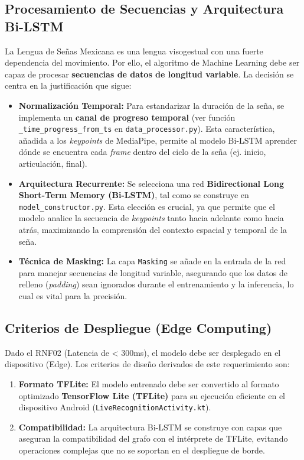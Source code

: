\subsection{Procesamiento de Secuencias y Arquitectura Bi-LSTM}
La Lengua de Señas Mexicana es una lengua visogestual con una fuerte dependencia del movimiento. Por ello, el algoritmo de Machine Learning debe ser capaz de procesar \textbf{secuencias de datos de longitud variable}. La decisión se centra en la justificación que sigue:

\begin{itemize}
    \item \textbf{Normalización Temporal:} Para estandarizar la duración de la seña, se implementa un \textbf{canal de progreso temporal} (ver función \texttt{\_time\_progress\_from\_ts} en \texttt{data\_processor.py}). Esta característica, añadida a los \textit{keypoints} de MediaPipe, permite al modelo Bi-LSTM aprender dónde se encuentra cada \textit{frame} dentro del ciclo de la seña (ej. inicio, articulación, final).
    \item \textbf{Arquitectura Recurrente:} Se selecciona una red \textbf{Bidirectional Long Short-Term Memory (Bi-LSTM)}, tal como se construye en \texttt{model\_constructor.py}. Esta elección es crucial, ya que permite que el modelo analice la secuencia de \textit{keypoints} tanto hacia adelante como hacia atrás, maximizando la comprensión del contexto espacial y temporal de la seña.
    \item \textbf{Técnica de Masking:} La capa \texttt{Masking} se añade en la entrada de la red para manejar secuencias de longitud variable, asegurando que los datos de relleno (\textit{padding}) sean ignorados durante el entrenamiento y la inferencia, lo cual es vital para la precisión.
\end{itemize}

\subsection{Criterios de Despliegue (Edge Computing)}
Dado el RNF02 (Latencia de < 300ms), el modelo debe ser desplegado en el dispositivo (Edge). Los criterios de diseño derivados de este requerimiento son:

\begin{enumerate}
    \item \textbf{Formato TFLite:} El modelo entrenado debe ser convertido al formato optimizado \textbf{TensorFlow Lite (TFLite)} para su ejecución eficiente en el dispositivo Android (\texttt{LiveRecognitionActivity.kt}).
    \item \textbf{Compatibilidad:} La arquitectura Bi-LSTM se construye con capas que aseguran la compatibilidad del grafo con el intérprete de TFLite, evitando operaciones complejas que no se soportan en el despliegue de borde.
\end{enumerate}

